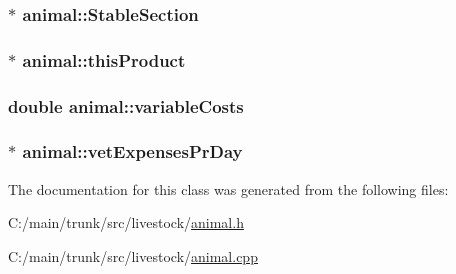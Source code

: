 \label{classanimal_a33be7bd5359038d124130c3ca62e44ee}
\hypertarget{classanimal_a02b1cede3021c02ac7fe882dd5dfb036}{
\subsubsection[{StableSection}]{$\ast$ {\bf animal::StableSection}}}
\label{classanimal_a02b1cede3021c02ac7fe882dd5dfb036}
\hypertarget{classanimal_a686e9edfe2ba45e7c160927e618cc3f6}{
\subsubsection[{thisProduct}]{$\ast$ {\bf animal::thisProduct}}}
\label{classanimal_a686e9edfe2ba45e7c160927e618cc3f6}
\hypertarget{classanimal_a9e4809e28ae703c997e135bf28469163}{
\subsubsection[{variableCosts}]{\setlength{\rightskip}{0pt plus 5cm}double {\bf animal::variableCosts}}}
\label{classanimal_a9e4809e28ae703c997e135bf28469163}
\hypertarget{classanimal_adc0a0b3c8cba52e8ffbe39fdf311887a}{
\subsubsection[{vetExpensesPrDay}]{$\ast$ {\bf animal::vetExpensesPrDay}}}
\label{classanimal_adc0a0b3c8cba52e8ffbe39fdf311887a}


The documentation for this class was generated from the following files:\begin{DoxyCompactItemize}
\item 
C:/main/trunk/src/livestock/\hyperlink{animal_8h}{animal.h}\item 
C:/main/trunk/src/livestock/\hyperlink{animal_8cpp}{animal.cpp}\end{DoxyCompactItemize}
